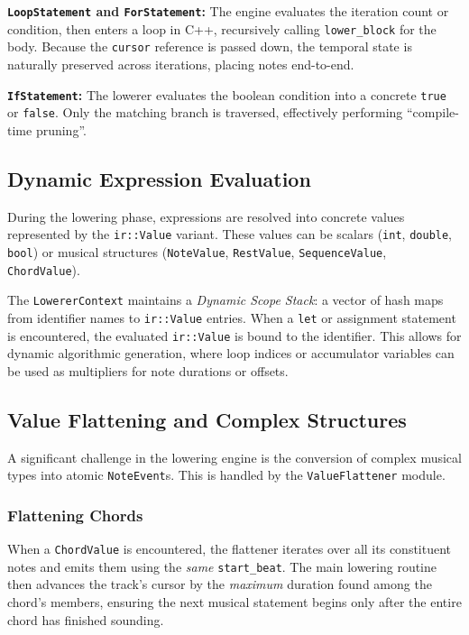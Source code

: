 \noindent \textbf{\texttt{LoopStatement} and \texttt{ForStatement}:} The engine evaluates the iteration count or
condition, then enters a loop in C++, recursively calling \texttt{lower\_block} for the body.
Because the \texttt{cursor} reference is passed down, the temporal state is naturally preserved across iterations,
placing notes end-to-end.

\noindent \textbf{\texttt{IfStatement}:} The lowerer evaluates the boolean condition into a concrete \texttt{true} or
\texttt{false}.
Only the matching branch is traversed, effectively performing ``compile-time pruning''.

\subsection{Dynamic Expression Evaluation}\label{detail-subsec:dynamic-expression-evaluation}

During the lowering phase, expressions are resolved into concrete values represented by the \texttt{ir::Value} variant.
These values can be scalars (\texttt{int}, \texttt{double}, \texttt{bool}) or musical structures (\texttt{NoteValue},
\texttt{RestValue}, \texttt{SequenceValue}, \texttt{ChordValue}).

The \texttt{LowererContext} maintains a \textit{Dynamic Scope Stack}: a vector of hash maps from identifier names to
\texttt{ir::Value} entries.
When a \texttt{let} or assignment statement is encountered, the evaluated \texttt{ir::Value} is bound to the identifier.
This allows for dynamic algorithmic generation, where loop indices or accumulator variables can be used as multipliers
for note durations or offsets.

\subsection{Value Flattening and Complex Structures}\label{detail-subsec:value-flattening-and-complex-structures}

A significant challenge in the lowering engine is the conversion of complex musical types into atomic
\texttt{NoteEvent}s.
This is handled by the \texttt{ValueFlattener} module.

\subsubsection{Flattening Chords}
When a \texttt{ChordValue} is encountered, the flattener iterates over all its constituent notes and emits them using
the \textit{same} \texttt{start\_beat}.
The main lowering routine then advances the track's cursor by the \textit{maximum} duration found among the chord's
members, ensuring the next musical statement begins only after the entire chord has finished sounding.


